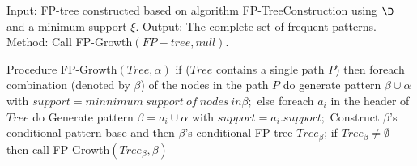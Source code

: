 Input: FP-tree constructed based on algorithm FP-TreeConstruction using $\D$
       and a minimum support $\xi$.
Output: The complete set of frequent patterns.
Method: Call FP-Growth$(FP-tree, null)$.

Procedure FP-Growth$(Tree, \alpha)$
{
if ($Tree$ contains a single path $P$)
then foreach combination (denoted by $\beta$) of the nodes in the path $P$ do
  generate pattern $\beta\cup\alpha$ with $support = minnimum\ support\ of\ nodes\ in \beta;$
else foreach $a_i$ in the header of $Tree$ do {
  Generate pattern $\beta=a_i\cup\alpha$ with $support = a_i.support;$
  Construct $\beta$'s conditional pattern base and then $\beta$'s conditional FP-tree $Tree_\beta$;
  if $Tree_\beta \neq\emptyset$
	then call FP-Growth$(Tree_\beta, \beta)$ }
}
